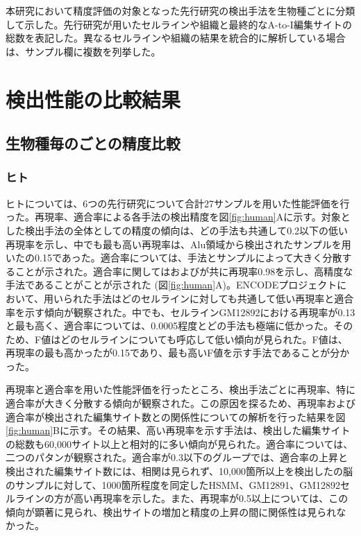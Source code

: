 \begin{flushleft}
	\small{本研究において精度評価の対象となった先行研究の検出手法を生物種ごとに分類して示した。先行研究が用いたセルラインや組織と最終的なA-to-I編集サイトの総数を表記した。異なるセルラインや組織の結果を統合的に解析している場合は、サンプル欄に複数を列挙した。}
\end{flushleft}
\newpage

\section{検出性能の比較結果}
\subsection{生物種毎のごとの精度比較}
\subsubsection{ヒト}
ヒトについては、6つの先行研究について合計27サンプルを用いた性能評価を行った。再現率、適合率による各手法の検出精度を図\ref{fig:human}Aに示す。対象とした検出手法の全体としての精度の傾向は、どの手法も共通して0.2以下の低い再現率を示し、中でも最も高い再現率は、Alu領域から検出されたサンプルを用いた\cite{Ramaswami:2012aa}の0.15であった。適合率については、手法とサンプルによって大きく分散することが示された。適合率に関しては\cite{Ramaswami:2012aa}および\cite{BahLeeLi1201}が共に再現率0.98を示し、高精度な手法であることがことが示された (図\ref{fig:human}A)。ENCODEプロジェクトにおいて、用いられた手法はどのセルラインに対しても共通して低い再現率と適合率を示す傾向が観察された。中でも、セルラインGM12892における再現率が0.13と最も高く、適合率については、0.0005程度とどの手法も極端に低かった。そのため、F値はどのセルラインについても呼応して低い傾向が見られた。F値は、再現率の最も高かった\cite{Ramaswami:2012aa}が0.15であり、最も高いF値を示す手法であることが分かった。
\par
再現率と適合率を用いた性能評価を行ったところ、検出手法ごとに再現率、特に適合率が大きく分散する傾向が観察された。この原因を探るため、再現率および適合率が検出された編集サイト数との関係性についての解析を行った結果を図\ref{fig:human}Bに示す。その結果、高い再現率を示す手法は、検出した編集サイトの総数も60,000サイト以上と相対的に多い傾向が見られた。適合率については、二つのパタンが観察された。適合率が0.3以下のグループでは、適合率の上昇と検出された編集サイト数には、相関は見られず、10,000箇所以上を検出した\cite{RamZhaPis1302}の脳のサンプルに対して、1000箇所程度を同定したHSMM、GM12891、GM12892セルラインの方が高い再現率を示した。また、再現率が0.5以上については、この傾向が顕著に見られ、検出サイトの増加と精度の上昇の間に関係性は見られなかった。
